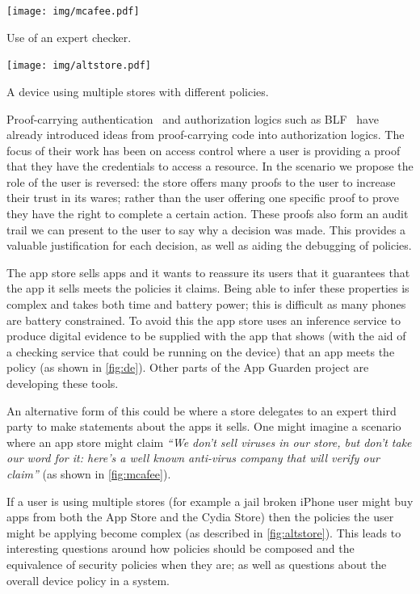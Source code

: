\documentclass[a4paper,sfsidenotes]{%
  scrartcl%
}
\begin{document}
\begin{marginfigure}
  \texttt{[image: img/mcafee.pdf]}
  \caption{Use of an expert checker.}
\label{fig:mcafee}
\end{marginfigure}

\begin{marginfigure}
  \texttt{[image: img/altstore.pdf]}
  \caption{A device using multiple stores with different policies.}
\label{fig:altstore}
\end{marginfigure}

Proof-carrying authentication~\cite{Appel:1999dq} and authorization logics such
as BLF~\cite{Whitehead:2004bu} have already introduced ideas from proof-carrying
code into authorization logics. The focus of their work has been on access
control where a user is providing a proof that they have the credentials to
access a resource.   In the scenario we propose the role of the user is
reversed: the store offers many proofs to the user to increase their trust in
its wares; rather than the user offering one specific proof to prove they have
the right to complete a certain action.  These proofs also form an audit trail
we can present to the user to say why a decision was made.  This provides a
valuable justification for each decision, as well as aiding the debugging of
policies.

The app store sells apps and it wants to reassure its users that
it guarantees that the app it sells meets the policies it
claims.  Being able to infer these properties is complex and takes both time and
battery power; this is difficult as many phones are battery constrained.  To
avoid this the app store uses an inference service to produce digital evidence
to be supplied with the app that shows (with the aid of a checking service that
could be running on the device) that an app meets the policy (as shown in
\autoref{fig:de}). Other parts of the App Guarden project are 
developing these tools.

An alternative form of this could be where a store delegates to an expert third
party to make statements about the apps it sells.  One might imagine a scenario
where an app store might claim \emph{``We don't sell viruses in our store, but
don't take our word for it: here's a well known anti-virus company that will
verify our claim''} (as shown in \autoref{fig:mcafee}).

If a user is using multiple stores (for example a jail broken iPhone user might
buy apps from both the App Store and the Cydia Store) then the policies the user
might be applying become complex (as described in \autoref{fig:altstore}).
This leads to interesting questions around how policies should be composed and
the equivalence of security policies when they are; as well as questions about
the overall device policy in a system.
\end{document}
